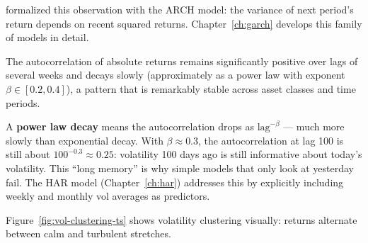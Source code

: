 \citet{Engle1982} formalized this observation with the ARCH model: the variance of next period's return depends on recent squared returns.
Chapter~\ref{ch:garch} develops this family of models in detail.

\begin{keyresult}
The autocorrelation of absolute returns remains significantly positive over lags of several weeks and decays slowly (approximately as a power law with exponent $\beta \in [0.2, 0.4]$), a pattern that is remarkably stable across asset classes and time periods.
\end{keyresult}

\begin{intuition}
A \textbf{power law decay} means the autocorrelation drops as $\text{lag}^{-\beta}$ --- much more slowly than exponential decay.
With $\beta \approx 0.3$, the autocorrelation at lag 100 is still about $100^{-0.3} \approx 0.25$: volatility 100 days ago is still informative about today's volatility.
This ``long memory'' is why simple models that only look at yesterday fail.
The HAR model (Chapter~\ref{ch:har}) addresses this by explicitly including weekly and monthly vol averages as predictors.
\end{intuition}

Figure~\ref{fig:vol-clustering-ts} shows volatility clustering visually: returns alternate between calm and turbulent stretches.

